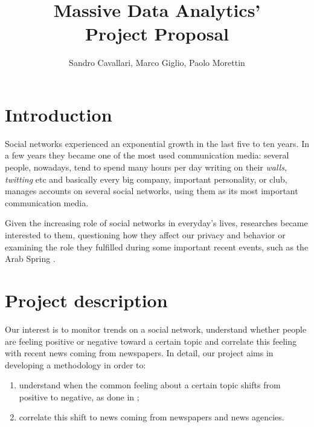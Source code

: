 \documentclass[a4paper]{article}
\begin{document}
\title{Massive Data Analytics'\\Project Proposal}
\author{Sandro Cavallari, Marco Giglio, Paolo Morettin}
\date{}
\maketitle

\section{Introduction}
Social networks experienced an exponential growth in the last five to ten years.
In a few years they became one of the most used communication media:
several people, nowadays, tend to spend many hours per day writing on their
\emph{walls}, \emph{twitting} etc and basically every big company, important
personality, or club, manages accounts on several social networks, using them as
its most important communication media.

Given the increasing role of social networks in everyday's lives, researches
became interested to them, questioning how they affect our privacy and behavior
\cite{Debatin}\cite{Acar} or examining the role they fulfilled during some
important recent events, such as the Arab Spring \cite{Howard}\cite{Lotan}.

\section{Project description}
Our interest is to monitor trends on a social network, understand whether people
are feeling positive or negative toward a certain topic and correlate this
feeling with recent news coming from newspapers. In detail, our project aims in
developing a methodology in order to:
\begin{enumerate}
\item understand when the common feeling about a certain topic shifts from positive
to negative, as done in \cite{Bifet};
\item correlate this shift to news coming from newspapers and news agencies.
\end{enumerate}
\end{document}
